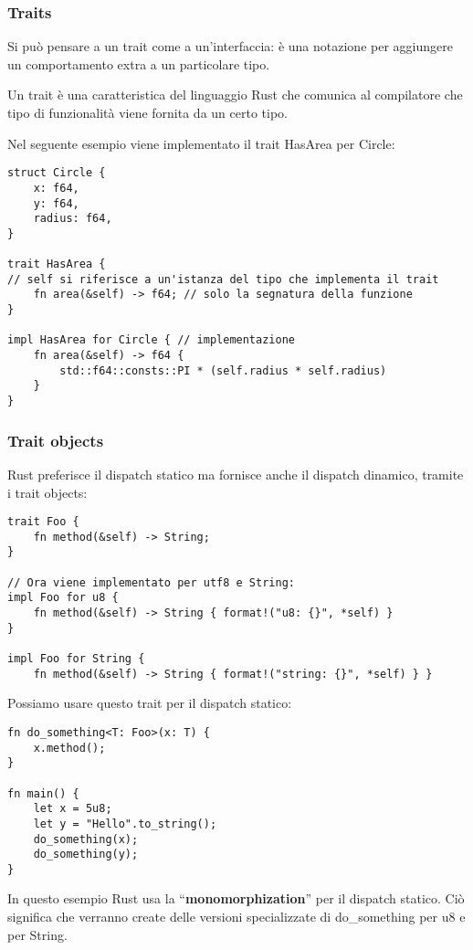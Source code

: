 \subsubsection{Traits}

Si può pensare a un trait come a un'interfaccia: è una notazione per aggiungere
un comportamento extra a un particolare tipo.

Un trait è una caratteristica del linguaggio Rust che comunica al compilatore
che tipo di funzionalità viene fornita da un certo tipo.

Nel seguente esempio viene implementato il trait HasArea per Circle:

\begin{lstlisting}
struct Circle {
    x: f64,
    y: f64,
    radius: f64,
}

trait HasArea {
// self si riferisce a un'istanza del tipo che implementa il trait
    fn area(&self) -> f64; // solo la segnatura della funzione
}

impl HasArea for Circle { // implementazione
    fn area(&self) -> f64 {
        std::f64::consts::PI * (self.radius * self.radius)
    }
}
\end{lstlisting}

\subsubsection{Trait objects}

Rust preferisce il dispatch statico ma fornisce anche il dispatch dinamico,
tramite i trait objects:

\begin{lstlisting}
trait Foo {
    fn method(&self) -> String;
}

// Ora viene implementato per utf8 e String:
impl Foo for u8 {
    fn method(&self) -> String { format!("u8: {}", *self) }
}

impl Foo for String {
    fn method(&self) -> String { format!("string: {}", *self) } }
\end{lstlisting}

Possiamo usare questo trait per il dispatch statico:

\begin{lstlisting}
fn do_something<T: Foo>(x: T) {
    x.method();
}

fn main() {
    let x = 5u8;
    let y = "Hello".to_string();
    do_something(x);
    do_something(y);
}
\end{lstlisting}

In questo esempio Rust usa la ``\textbf{monomorphization}'' per il dispatch
statico. Ciò significa che verranno create delle versioni specializzate di
do\_something per u8 e per String.

